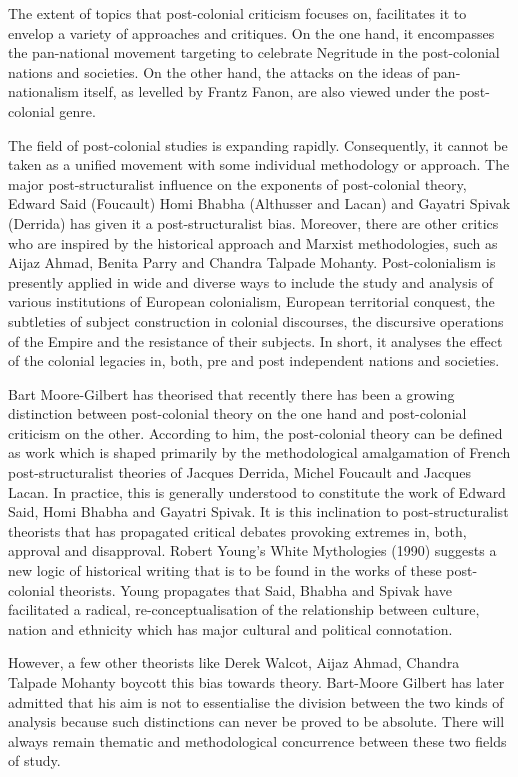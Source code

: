 The extent of topics that post-colonial criticism focuses on, facilitates it to envelop a variety of approaches and critiques. On the one hand, it encompasses the pan-national movement targeting to celebrate Negritude in the post-colonial nations and societies. On the other hand, the attacks on the ideas of pan-nationalism itself, as levelled by Frantz Fanon, are also viewed under the post-colonial genre.

The field of post-colonial studies is expanding rapidly. Consequently, it cannot be taken as a unified movement with some individual methodology or approach. The major post-structuralist influence on the exponents of post-colonial theory, Edward Said (Foucault) Homi Bhabha (Althusser and Lacan) and Gayatri Spivak (Derrida) has given it a post-structuralist bias. Moreover, there are other critics who are inspired by the historical approach and Marxist methodologies, such as Aijaz Ahmad, Benita Parry and Chandra Talpade Mohanty. Post-colonialism is presently applied in wide and diverse ways to include the study and analysis of various institutions of European colonialism, European territorial conquest, the subtleties of subject construction in colonial discourses, the discursive operations of the Empire and the resistance of their subjects. In short, it analyses the effect of the colonial legacies in, both, pre and post independent nations and societies.

Bart Moore-Gilbert has theorised that recently there has been a growing distinction between post-colonial theory on the one hand and post-colonial criticism on the other. According to him, the post-colonial theory can be defined as work which is shaped primarily by the methodological amalgamation of French post-structuralist theories of Jacques Derrida, Michel Foucault and Jacques Lacan. In practice, this is generally understood to constitute the work of Edward Said, Homi Bhabha and Gayatri Spivak. It is this inclination to post-structuralist theorists that has propagated critical debates provoking extremes in, both, approval and disapproval. Robert Young’s White Mythologies (1990) suggests a new logic of historical writing that is to be found in the works of these post-colonial theorists. Young propagates that Said, Bhabha and Spivak have facilitated a radical, re-conceptualisation of the relationship between culture, nation and ethnicity which has major cultural and political connotation. 

However, a few other theorists like Derek Walcot, Aijaz Ahmad, Chandra Talpade Mohanty boycott this bias towards theory. Bart-Moore Gilbert has later admitted that his aim is not to essentialise the division between the two kinds of analysis because such distinctions can never be proved to be absolute. There will always remain thematic and methodological concurrence between these two fields of study. 

